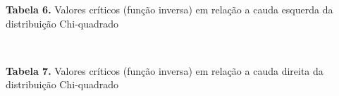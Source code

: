 \documentclass[
]{book}
\begin{document}
\textbf{Tabela 6.} Valores críticos (função inversa) em relação a cauda esquerda da distribuição Chi-quadrado

\hypertarget{htmlwidget-a6d132ff318a85d34787}{}
\begin{datatables}

\end{datatables}

\(~\)
\(~\)
\(~\)

\textbf{Tabela 7.} Valores críticos (função inversa) em relação a cauda direita da distribuição Chi-quadrado

\hypertarget{htmlwidget-212088ef8df36492caf0}{}
\begin{datatables}

\end{datatables}

  

\printindex
\printindex[function]
\end{document}
